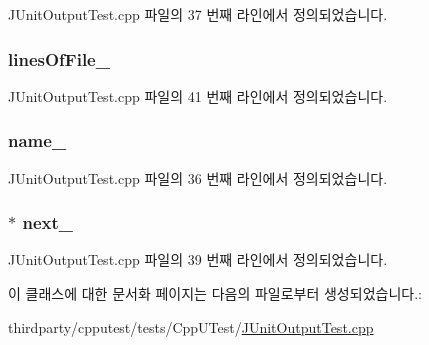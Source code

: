 J\+Unit\+Output\+Test.\+cpp 파일의 37 번째 라인에서 정의되었습니다.

\subsubsection[{\texorpdfstring{lines\+Of\+File\+\_\+}{linesOfFile_}}]{ lines\+Of\+File\+\_\+\hspace{0.3cm}{\ttfamily [private]}}\hypertarget{class_file_for_j_unit_output_tests_acb3cf229d6cff602ef29a0d6412d1bbe}{}\label{class_file_for_j_unit_output_tests_acb3cf229d6cff602ef29a0d6412d1bbe}


J\+Unit\+Output\+Test.\+cpp 파일의 41 번째 라인에서 정의되었습니다.

\subsubsection[{\texorpdfstring{name\+\_\+}{name_}}]{ name\+\_\+\hspace{0.3cm}{\ttfamily [private]}}\hypertarget{class_file_for_j_unit_output_tests_aac73c86e1e892f392d1fc423e25f51a8}{}\label{class_file_for_j_unit_output_tests_aac73c86e1e892f392d1fc423e25f51a8}


J\+Unit\+Output\+Test.\+cpp 파일의 36 번째 라인에서 정의되었습니다.

\subsubsection[{\texorpdfstring{next\+\_\+}{next_}}]{$\ast$ next\+\_\+\hspace{0.3cm}{\ttfamily [private]}}\hypertarget{class_file_for_j_unit_output_tests_a19ad95ea159a0bb654f50da66b6da9c7}{}\label{class_file_for_j_unit_output_tests_a19ad95ea159a0bb654f50da66b6da9c7}


J\+Unit\+Output\+Test.\+cpp 파일의 39 번째 라인에서 정의되었습니다.



이 클래스에 대한 문서화 페이지는 다음의 파일로부터 생성되었습니다.\+:\begin{DoxyCompactItemize}
\item 
thirdparty/cpputest/tests/\+Cpp\+U\+Test/\hyperlink{_j_unit_output_test_8cpp}{J\+Unit\+Output\+Test.\+cpp}\end{DoxyCompactItemize}
